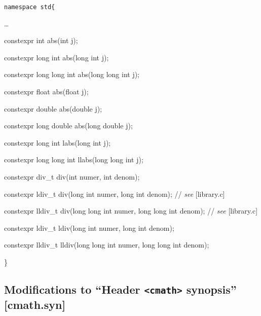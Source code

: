 \documentclass[prd,twocolumn,amsmath,amssymb,nofootinbib,eqsecnum]{revtex4-1}
\newcommand{\code}[1]{{\tt #1}}
\newcommand{\header}[1]{{\tt <#1>}}
\newcommand{\highlight}[1]{{\color{green} #1}}
\newcommand{\stdcomment}[1]{{// {\it see} [#1]}}
\begin{document}
\code{namespace std\{

\vspace{2ex}

\ldots

\vspace{2ex}

\highlight{constexpr} int abs(int j);

\highlight{constexpr}  long int abs(long int j);

\highlight{constexpr}  long long int abs(long long int j);

\highlight{constexpr}  float abs(float j);

\highlight{constexpr} double abs(double j);

\highlight{constexpr} long double abs(long double j);

\vspace{2ex}

\highlight{constexpr} long int labs(long int j);

\highlight{constexpr}  long long int llabs(long long int j);

\vspace{2ex}

\highlight{constexpr} div\_t div(int numer, int denom);

\highlight{constexpr} ldiv\_t div(long int numer, long int denom); \stdcomment{library.c}

\highlight{constexpr} lldiv\_t div(long long int numer, long long int denom); \stdcomment{library.c}

\highlight{constexpr} ldiv\_t ldiv(long int numer, long int denom);

\highlight{constexpr} lldiv\_t lldiv(long long int numer, long long int denom);	

\}}

\subsection{Modifications to  ``Header \header{cmath} synopsis'' [cmath.syn]}
\end{document}
